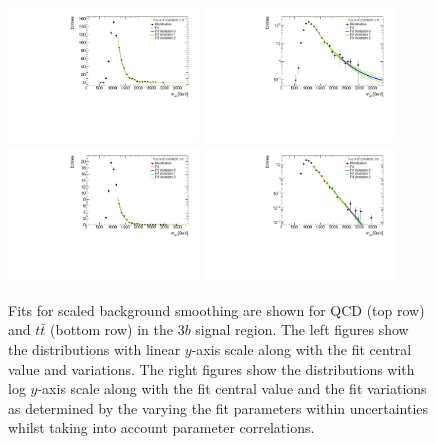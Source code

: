 \begin{figure}[htbp!]
\begin{center}
\includegraphics[angle=270, width=0.45\textwidth]{figures/boosted/Smooth/qcd_est_ThreeTag_Signal_mHH_pole.pdf}
\includegraphics[angle=270, width=0.45\textwidth]{figures/boosted/Smooth/qcd_est_ThreeTag_Signal_mHH_pole_l.pdf}\\
%   
\includegraphics[angle=270, width=0.45\textwidth]{figures/boosted/Smooth/ttbar_est_ThreeTag_Signal_mHH_pole.pdf}
\includegraphics[angle=270, width=0.45\textwidth]{figures/boosted/Smooth/ttbar_est_ThreeTag_Signal_mHH_pole_l.pdf}\\
\caption{Fits for scaled background smoothing are shown for QCD (top row) and $t\bar{t}$ (bottom row) in the $3b$ signal region.  The left figures show the distributions with linear $y$-axis scale along with the fit central value and variations. The right figures show the  distributions with log $y$-axis scale along with the fit central value and the fit variations as determined by the varying the fit parameters within uncertainties whilst taking into account parameter correlations. }
\label{fig:signal-region-mjjscaled-3b-smoothing}
\end{center}
\end{figure}

